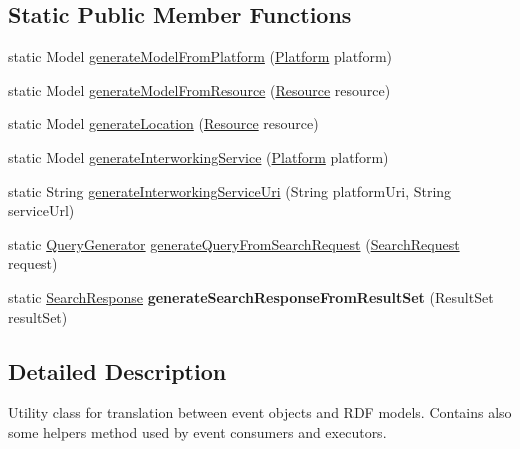 \subsection*{Static Public Member Functions}
\begin{DoxyCompactItemize}
\item 
static Model \hyperlink{classeu_1_1h2020_1_1symbiote_1_1handlers_1_1HandlerUtils_ad6758184c042a53b3dbe986b86f7f45f}{generate\+Model\+From\+Platform} (\hyperlink{classeu_1_1h2020_1_1symbiote_1_1model_1_1Platform}{Platform} platform)
\item 
static Model \hyperlink{classeu_1_1h2020_1_1symbiote_1_1handlers_1_1HandlerUtils_a42342da7136ec0aead73f7edde4a77cd}{generate\+Model\+From\+Resource} (\hyperlink{classeu_1_1h2020_1_1symbiote_1_1model_1_1Resource}{Resource} resource)
\item 
static Model \hyperlink{classeu_1_1h2020_1_1symbiote_1_1handlers_1_1HandlerUtils_a909e1a5f76a148cfd82c1b9ba5b1dd91}{generate\+Location} (\hyperlink{classeu_1_1h2020_1_1symbiote_1_1model_1_1Resource}{Resource} resource)
\item 
static Model \hyperlink{classeu_1_1h2020_1_1symbiote_1_1handlers_1_1HandlerUtils_a7fbf9061d7f1d40a19c1257d7d256488}{generate\+Interworking\+Service} (\hyperlink{classeu_1_1h2020_1_1symbiote_1_1model_1_1Platform}{Platform} platform)
\item 
static String \hyperlink{classeu_1_1h2020_1_1symbiote_1_1handlers_1_1HandlerUtils_a292f58eeb374e03ec1591c89b8edced1}{generate\+Interworking\+Service\+Uri} (String platform\+Uri, String service\+Url)
\item 
static \hyperlink{classeu_1_1h2020_1_1symbiote_1_1query_1_1QueryGenerator}{Query\+Generator} \hyperlink{classeu_1_1h2020_1_1symbiote_1_1handlers_1_1HandlerUtils_a0973ccf775f6cbbeed1cc294d8370624}{generate\+Query\+From\+Search\+Request} (\hyperlink{classeu_1_1h2020_1_1symbiote_1_1query_1_1SearchRequest}{Search\+Request} request)
\item 
static \hyperlink{classeu_1_1h2020_1_1symbiote_1_1query_1_1SearchResponse}{Search\+Response} {\bfseries generate\+Search\+Response\+From\+Result\+Set} (Result\+Set result\+Set)\hypertarget{classeu_1_1h2020_1_1symbiote_1_1handlers_1_1HandlerUtils_a64592fa49275e0f94e6865b3da502f95}{}\label{classeu_1_1h2020_1_1symbiote_1_1handlers_1_1HandlerUtils_a64592fa49275e0f94e6865b3da502f95}

\end{DoxyCompactItemize}


\subsection{Detailed Description}
Utility class for translation between event objects and R\+DF models. Contains also some helpers method used by event consumers and executors.

